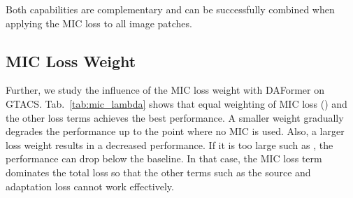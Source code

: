 \documentclass[10pt,twocolumn,letterpaper]{article}
\begin{document}
Both capabilities are complementary and can be successfully combined when applying the MIC loss to all image patches.



\subsection{MIC Loss Weight }

Further, we study the influence of the MIC loss weight  with DAFormer on GTACS. Tab.~\ref{tab:mic_lambda} shows that equal weighting of MIC loss () and the other loss terms achieves the best performance. A smaller weight gradually degrades the performance up to the point where no MIC is used. Also, a larger loss weight results in a decreased performance. If it is too large such as , the performance can drop below the baseline. In that case, the MIC loss term dominates the total loss so that the other terms such as the source and adaptation loss cannot work effectively.
\end{document}
